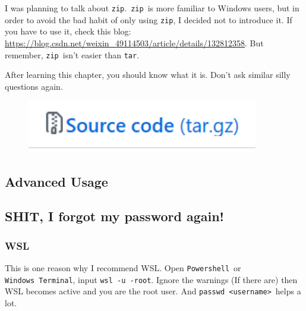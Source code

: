 \documentclass[12pt]{ctexart}
\begin{document}
I was planning to talk about \texttt{zip}.\ \texttt{zip}\ is more familiar
to Windows users, but in order to avoid the bad habit of only using
\texttt{zip}, I decided not to introduce it. If you have to use it,
check this blog:
\url{https://blog.csdn.net/weixin_49114503/article/details/132812358}.
But remember, \texttt{zip}\ isn't easier than
\texttt{tar}.

After learning this chapter, you should know what it is.
Don't ask similar silly questions again.

\begin{figure}[H]
    \centering
    \includegraphics[width=0.9\textwidth,keepaspectratio]{assets/Linux/1.12 Linux compression commands/2.png}
\end{figure}

\newpage
\thispagestyle{empty}
\begin{center}
    \vspace*{96pt}
    \fontsize{60}{60}\par
    \fontsize{26}{31.2}\section{\textbf{Advanced Usage}}\par %
    \vspace{25pt}
    \fontsize{18}{21.6}\par %
    \vfill
\end{center}

\fontsize{12}{14}
\newpage
\subsection{\textbf{SHIT, I forgot my password again!}}

\subsubsection{\textbf{WSL}}

This is one reason why I recommend WSL. Open \texttt{Powershell}\ or
\texttt{Windows\ Terminal}, input \texttt{wsl\ -u\ -root}. Ignore the
warnings (If there are) then WSL becomes active and you are the root
user. And \texttt{passwd\ \textless{}username\textgreater{}}\ helps a
lot.
\end{document}
